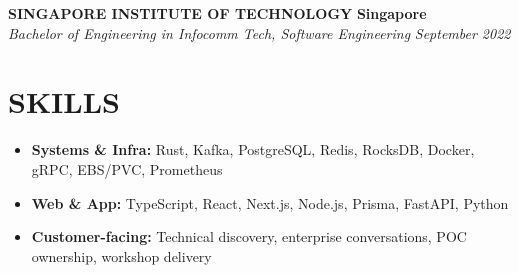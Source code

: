 \documentclass[11pt,letterpaper]{article}
\newcommand{\role}[4]{
  \vspace{0.15em}
  \begin{center}
  \textbf{#1} \hfill \textbf{#2} \\
  \textit{#3} \hfill \textit{#4}
  \end{center}
  \vspace{-1em}
}
\begin{document}
\role{SINGAPORE INSTITUTE OF TECHNOLOGY}{Singapore}{Bachelor of Engineering in Infocomm Tech, Software Engineering}{September 2022}

\section{SKILLS}

\begin{itemize}
  \item \textbf{Systems \& Infra:} Rust, Kafka, PostgreSQL, Redis, RocksDB, Docker, gRPC, EBS/PVC, Prometheus
  \item \textbf{Web \& App:} TypeScript, React, Next.js, Node.js, Prisma, FastAPI, Python
  \item \textbf{Customer-facing:} Technical discovery, enterprise conversations, POC ownership, workshop delivery
\end{itemize}
\end{document}
